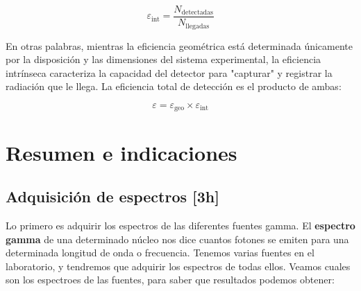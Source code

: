 \documentclass[11pt]{article}
\begin{document}
\begin{equation}
    \varepsilon_{\text{int}} = \frac{N_{\text{detectadas}}}{N_{\text{llegadas}}} 
\end{equation}

En otras palabras, mientras la eficiencia geométrica está determinada únicamente por la disposición y las dimensiones del sistema experimental, la eficiencia intrínseca caracteriza la capacidad del detector para "capturar" y registrar la radiación que le llega. La eficiencia total de detección es el producto de ambas:

\begin{equation}
    \varepsilon=\varepsilon_{\text{geo}} \times \varepsilon_{\text{int}}
\end{equation}




\newpage

\section{Resumen e indicaciones}

\subsection{Adquisición de espectros [3h]}

Lo primero es adquirir los espectros de las diferentes fuentes gamma. El \textbf{espectro gamma} de una determinado núcleo nos dice cuantos fotones se emiten para una determinada longitud de onda o frecuencia. Tenemos varias fuentes en el laboratorio, y tendremos que adquirir los espectros de todas ellos. Veamos cuales son los espectroes de las fuentes, para saber que resultados podemos obtener: 
\end{document}
